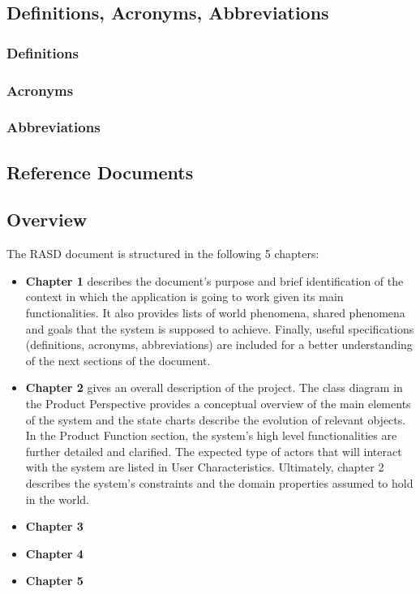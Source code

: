 \documentclass{article}
\begin{document}
\subsection{Definitions, Acronyms, Abbreviations}
\subsubsection{Definitions}
\subsubsection{Acronyms}
\subsubsection{Abbreviations}

\subsection{Reference Documents}
\subsection{Overview}
The RASD document is structured in the following 5 chapters:
\begin{itemize}
\item\textbf{Chapter 1} describes the document’s purpose and brief identification of the context in which the application is going to work given its main functionalities. It also provides lists of world phenomena, shared phenomena and goals that the system is supposed to achieve. Finally, useful specifications (definitions, acronyms, abbreviations) are included for a better understanding of the next sections of the document.
\item\textbf{Chapter 2} gives an overall description of the project. The class diagram in the Product Perspective provides a conceptual overview of the main elements of the system and the state charts describe the evolution of relevant objects. In the Product Function section, the system’s high level functionalities are further detailed and clarified. The expected type of actors that will interact with the system are listed in User Characteristics. Ultimately, chapter 2 describes the system’s constraints and the domain properties assumed to hold in the world.
\item\textbf{Chapter 3}
\item\textbf{Chapter 4}
\item\textbf{Chapter 5}
\end{itemize}
\end{document}
